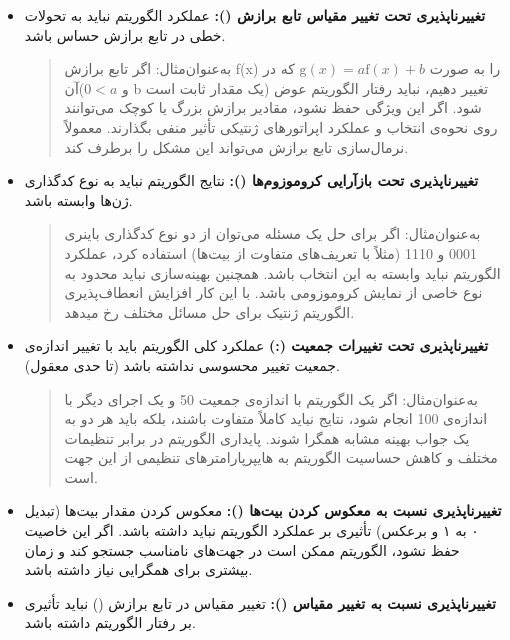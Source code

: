 \documentclass[12pt]{exam}
\begin{document}
\begin{questions}
\begin{itemize}
\begin{quote}
	 	\end{quote}
		 	
	 	\item \textbf{تغییرناپذیری تحت تغییر مقیاس تابع برازش ():}
	 	عملکرد الگوریتم نباید به تحولات خطی در تابع برازش حساس باشد.
	 	
	 	\begin{quote}
 	به‌عنوان‌مثال:
اگر تابع برازش f(x) را به صورت
$\mathrm{g} (x) = a \mathrm{f} (x) + b $
که در آن($0<a$ و b  یک مقدار ثابت است) تغییر دهیم، نباید رفتار الگوریتم عوض شود. اگر این ویژگی حفظ نشود، مقادیر برازش بزرگ یا کوچک می‌توانند روی نحوه‌ی انتخاب و عملکرد اپراتورهای ژنتیکی تأثیر منفی بگذارند. معمولاً نرمال‌سازی تابع برازش می‌تواند این مشکل را برطرف کند.
	 	\end{quote}
	
	 	
	 	\item \textbf{تغییرناپذیری تحت بازآرایی کروموزوم‌ها ():}
	 	نتایج الگوریتم نباید به نوع کدگذاری ژن‌ها وابسته باشد.
	 	
	 	\begin{quote}
	 			به‌عنوان‌مثال:
	 		اگر برای حل یک مسئله می‌توان از دو نوع کدگذاری باینری 0001  و 1110 (مثلاً با تعریف‌های متفاوت از بیت‌ها) استفاده کرد، عملکرد الگوریتم نباید وابسته به این انتخاب باشد. همچنین بهینه‌سازی نباید محدود به نوع خاصی از نمایش کروموزومی باشد. با این کار افزایش انعطاف‌پذیری الگوریتم ژنتیک برای حل مسائل مختلف رخ میدهد.
	 	\end{quote}
	 
	 	\item \textbf{تغییرناپذیری تحت تغییرات جمعیت (:)}
	 	عملکرد کلی الگوریتم باید با تغییر اندازه‌ی جمعیت تغییر محسوسی نداشته باشد (تا حدی معقول).
	 	 
	 	 \begin{quote}
	به‌عنوان‌مثال:
اگر یک الگوریتم با اندازه‌ی جمعیت 50 و یک اجرای دیگر با اندازه‌ی 100 انجام شود، نتایج نباید کاملاً متفاوت باشند، بلکه باید هر دو به یک جواب بهینه مشابه همگرا شوند. پایداری الگوریتم در برابر تنظیمات مختلف و کاهش حساسیت الگوریتم به هایپرپارامترهای تنظیمی از این جهت است. 


	 	 \end{quote}
	 \item \textbf{  تغییرناپذیری نسبت به معکوس کردن بیت‌ها ():}
	 معکوس کردن مقدار بیت‌ها (تبدیل ۰ به ۱ و برعکس) تأثیری بر عملکرد الگوریتم نباید داشته باشد.
	 اگر این خاصیت حفظ نشود، الگوریتم ممکن است در جهت‌های نامناسب جستجو کند و زمان بیشتری برای همگرایی نیاز داشته باشد.
	 	\item \textbf{ تغییرناپذیری نسبت به تغییر مقیاس ():}
	 	تغییر مقیاس در تابع برازش 	() نباید تأثیری بر رفتار الگوریتم داشته باشد.
	 	

\end{itemize}
\end{questions}
\end{document}
